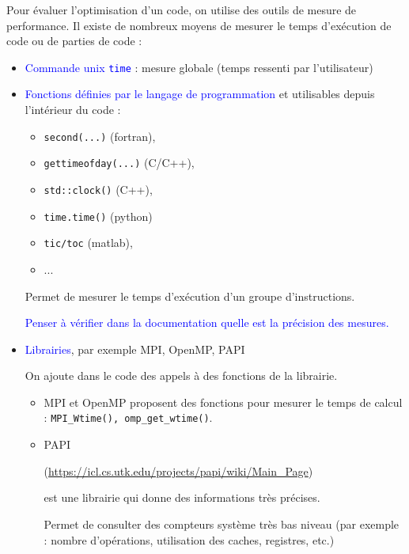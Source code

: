 \documentclass{beamer}
\begin{document}
\begin{frame}
	Pour évaluer l'optimisation d'un code, on utilise des outils de mesure de performance.
	Il existe de nombreux moyens de mesurer le temps d’exécution de code ou de parties de
	code :
	
        \medskip
	\begin{itemize}
		\item \textcolor{blue}{Commande unix {\tt time}} : mesure globale (temps ressenti par l’utilisateur)
        \medskip

        \item \textcolor{blue}{Fonctions définies par le langage de programmation} et utilisables depuis l’intérieur du code :
	        \begin{itemize}
	          	\item {\tt second(...)} (fortran),
	          	\item {\tt gettimeofday(...)} (C/C++),
	          	\item {\tt std::clock()} (C++),
	          	\item {\tt time.time()} (python)
	          	\item {\tt 	tic/toc} (matlab),
	          	\item ...
          	\end{itemize}
		Permet de mesurer le temps d’exécution d’un groupe d’instructions.
		
		\textcolor{blue}{Penser à vérifier dans la documentation quelle est la précision des mesures.}
	\end{itemize}

\end{frame}

\begin{frame}
	\begin{itemize}
	\item \textcolor{blue}{Librairies}, par exemple MPI, OpenMP, PAPI
	
	On ajoute dans le code des appels à des fonctions de la librairie.

	\medskip
	\begin{itemize}
	\item MPI et OpenMP proposent des fonctions pour mesurer le temps de calcul :	{\tt MPI\_Wtime(), omp\_get\_wtime()}.
	\medskip
	
	\item PAPI 
	
	\hbox{\small(\url{https://icl.cs.utk.edu/projects/papi/wiki/Main_Page})}
	\medskip
	
	est une librairie qui donne des informations très précises.
	
	\medskip
	 Permet de consulter des compteurs système très bas niveau (par exemple : nombre
	 d’opérations, utilisation des caches, registres, etc.)
	\end{itemize}
	\end{itemize}

	
\end{frame}
\end{document}
